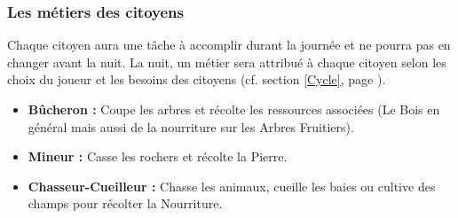 \documentclass[a4paper]{memoir}
\begin{document}
				\subsubsection{Les métiers des citoyens}
					\label{Metier}
					Chaque citoyen aura une tâche à accomplir durant la journée et ne pourra pas en changer avant la nuit. La nuit, un métier sera attribué à chaque citoyen selon les choix du joueur et les besoins des citoyens (cf. section \ref{Cycle}, page \pageref{Cycle}).
					\begin{itemize}[label=$\bullet$]
						\item \textbf{Bûcheron :} Coupe les arbres et récolte les ressources associées (Le Bois en général mais aussi de la nourriture sur les Arbres Fruitiers).
						\item \textbf{Mineur :} Casse les rochers et récolte la Pierre.
						\item \textbf{Chasseur-Cueilleur :} Chasse les animaux, cueille les baies ou cultive des champs pour récolter la Nourriture.
					\end{itemize}
\end{document}
